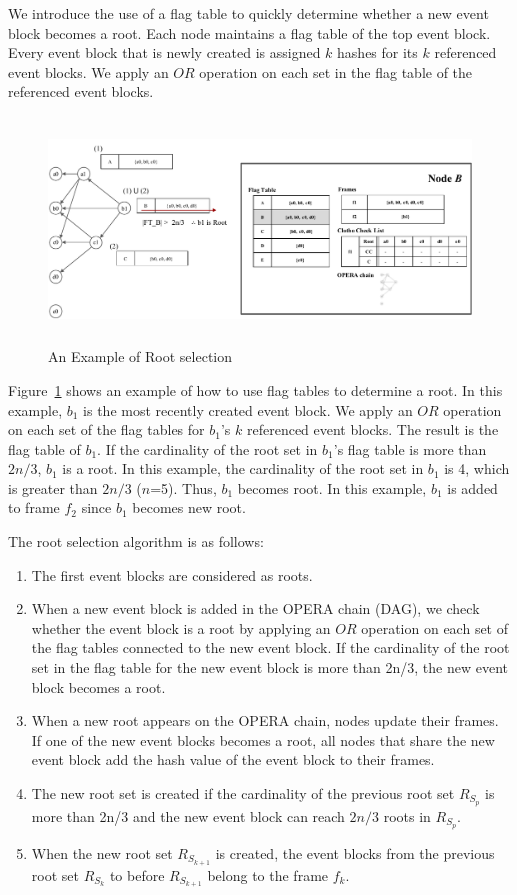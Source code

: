 \documentclass{article}
\begin{document}
We introduce the use of a flag table to quickly determine whether a new event block becomes a root. Each node maintains a flag table of the top event block.
Every event block that is newly created is assigned $k$ hashes for its $k$ referenced event blocks. We apply an $OR$ operation on each set in the flag table of the referenced event blocks.

\begin{figure} [H] \centering  
\includegraphics[height=6cm, width=1.0\columnwidth]{Root_selection.pdf}
\caption{An Example of Root selection}
\label{fig:ex_ft}
\end{figure}

Figure~\ref{fig:ex_ft} shows an example of how to use flag tables to determine a root. In this example, $b_1$ is the most recently created event block. We apply an $OR$ operation on each set of the flag tables for $b_1$'s $k$ referenced event blocks. The result is the flag table of $b_1$.  If the cardinality of the root set in $b_1$'s flag table is more than $2n/3$, $b_1$ is a root. In this example, the cardinality of the root set in $b_1$ is 4, which is greater than $2n/3$ ($n$=5). Thus, $b_1$ becomes root. In this example, $b_1$ is added to frame $f_2$ since $b_1$ becomes new root. 

The root selection algorithm is as follows:

\begin{enumerate}
\item The first event blocks are considered as roots. 
\item When a new event block is added in the OPERA chain (DAG), we check whether the event block is a root by applying an $OR$ operation on each set of the flag tables connected to the new event block. If the cardinality of the root set in the flag table for the new event block is more than 2n/3, the new event block becomes a root. 
\item When a new root appears on the OPERA chain, nodes update their frames. If one of the new event blocks becomes a root, all nodes that share the new event block add the hash value of the event block to their frames.  
\item The new root set is created if the cardinality of the previous root set $R_{S_p}$ is more than 2n/3 and the new event block can reach $2n/3$ roots in $R_{S_p}$.
\item When the new root set $R_{S_{k+1}}$ is created, the event blocks from the previous root set $R_{S_k}$ to before $R_{S_{k+1}}$ belong to the frame $f_k$.
\end{enumerate}
\end{document}
